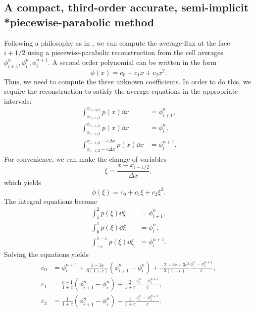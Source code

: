 \documentclass[../thesis.tex]{subfiles}
\begin{document}
\subsection[]{A compact, third-order accurate, semi-implicit \\*piecewise-parabolic method}
Following a philosophy as in \cite{1977_VanLeer},
we can compute the average-flux at the face \(i+1/2\) using a piecewise-parabolic reconstruction from the cell averages \(\phi_{i+1}^{n}, \phi_{i}^{n}, \phi_{i}^{n+1}\). A second order polynomial can be written in the form
\begin{equation}
    \phi(x) = c_0 + c_1 x + c_2 x^2.
\end{equation}
Thus, we need to compute the three unknown coefficients. In order to do this, we require the reconstruction to satisfy the average equations in the appropriate intervals:
\begin{equation}
    \begin{split}
        \int_{x_{i+1/2}}^{x_{i+3/2}} p(x) \dd{x}
        &= \phi_{i+1}^{n},
        \\
        \int_{x_{i-1/2}}^{x_{i+1/2}} p(x) \dd{x}
        &= \phi_{i}^{n},
        \\
        \int_{x_{i-1/2} - c\Delta x}^{x_{i+1/2} - c\Delta x} p(x) \dd{x}
        &= \phi_{i}^{n+1}.
    \end{split}
\end{equation}
For convenience, we can make the change of variables
\begin{equation}
    \xi = \frac{x-x_{i-1/2}}{\Delta x},
\end{equation}
which yields
\begin{equation}\label{eqn: parabola-xi}
    \phi(\xi) = c_0 + c_1\xi + c_2\xi^2.
\end{equation}
The integral equations become
\begin{equation}\label{eqn: parabola-integral-xi}
    \begin{split}
        \int_{1}^{2} p(\xi) \dd{\xi}
        &= \phi_{i+1}^{n},
        \\
        \int_{0}^{1} p(\xi) \dd{\xi}
        &= \phi_{i}^{n},
        \\
        \int_{-c}^{1-c} p(\xi) \dd{\xi}
        &= \phi_{i}^{n+1}.
    \end{split}
\end{equation}
Solving the equations yields
\begin{equation}
    \begin{split}
        c_0 &= \phi_{i}^{n+1}
        +\frac{1-3c}{6(1+c)}
        \left( \phi_{i+1}^{n}-\phi_{i}^{n} \right)
        +\frac{-2+3c+3c^2}{3(1+c)}
        \frac{\phi_{i}^{n}-\phi_{i}^{n+1}}{c},
        \\
        c_1 &=
        \frac{c-1}{1+c}
        \left( \phi_{i+1}^{n}-\phi_{i}^{n} \right)
        +\frac{2}{1+c}
        \frac{\phi_{i}^{n}-\phi_{i}^{n+1}}{c},
        \\
        c_2 &=
        \frac{1}{1+c}
        \left( \phi_{i+1}^{n}-\phi_{i}^{n} \right)
        -\frac{1}{1+c}
        \frac{\phi_{i}^{n}-\phi_{i}^{n+1}}{c}.
    \end{split}
\end{equation}
\end{document}
